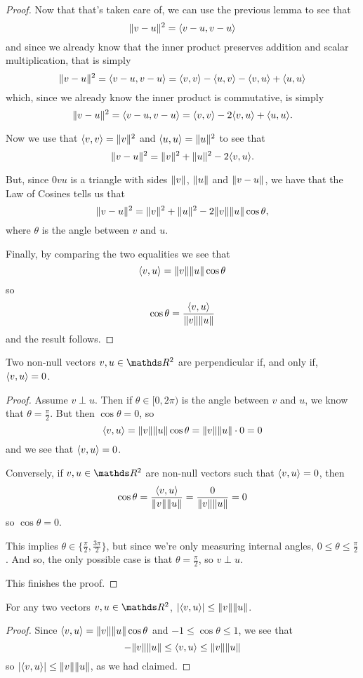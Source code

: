 \begin{proof}
	Now that that's taken care of, we can use the previous lemma to see that 
	\[\lVert v-u\rVert^2=\langle v-u,v-u\rangle\]and since we already know that the inner product preserves addition and scalar multiplication, that is simply
	\[\lVert v-u\rVert^2=\langle v-u,v-u\rangle=\langle v,v\rangle-\langle u,v\rangle-\langle v,u\rangle+\langle u,u\rangle\]which, since we already know the inner product is commutative, is simply
	\[\lVert v-u\rVert^2=\langle v-u,v-u\rangle=\langle v,v\rangle-2\langle v,u\rangle+\langle u,u\rangle.\]
	
	Now we use that $\langle v,v\rangle=\lVert v\rVert^2$ and $\langle u,u\rangle=\lVert u\rVert^2$ to see that
	\[\lVert v-u\rVert^2=\lVert v\rVert^2+\lVert u\rVert^2-2\langle v,u\rangle.\]
	
	But, since $0vu$ is a triangle with sides $\lVert v\rVert$, $\lVert u\rVert$ and $\lVert v-u\rVert$, we have that the Law of Cosines tells us that
	\[\lVert v-u\rVert^2=\lVert v\rVert^2+\lVert u\rVert^2-2\lVert v\rVert\lVert u\rVert\cos\theta,\]where $\theta$ is the angle between $v$ and $u$.
	
	Finally, by comparing the two equalities we see that\[\langle v,u\rangle=\lVert v\rVert\lVert u\rVert\cos\theta\]so
	\[\cos\theta=\frac{\langle v,u\rangle}{\lVert v\rVert\lVert u\rVert}\]and the result follows.
\end{proof}
\begin{cor}
	Two non-null vectors $v,u\in\R^2$ are perpendicular if, and only if, $\langle v,u\rangle=0$.
\end{cor}
\begin{proof}
	Assume $v\perp u$. Then if $\theta\in[0,2\pi)$ is the angle between $v$ and $u$, we know that $\theta=\frac{\pi}{2}$. But then $\cos\theta=0$, so
	\[\langle v,u\rangle=\lVert v\rVert\lVert u\rVert\cos\theta=\lVert v\rVert\lVert u\rVert\cdot0=0\]and we see that $\langle v,u\rangle=0$.
	
	Conversely, if $v,u\in \R^2$ are non-null vectors such that $\langle v,u\rangle=0$, then
	\[\cos\theta=\frac{\langle v,u\rangle}{\lVert v\rVert\lVert u\rVert}=\frac{0}{\lVert v\rVert\lVert u\rVert}=0\]so $\cos\theta=0$.
	
	This implies $\theta\in\{\frac{\pi}{2},\frac{3\pi}{2}\}$, but since we're only measuring internal angles, $0\leq \theta\leq\frac{\pi}{2}$. And so, the only possible case is that $\theta=\frac{\pi}{2}$, so $v\perp u$.
	
	This finishes the proof.
\end{proof}

\begin{cor}
	For any two vectors $v,u\in \R^2$, $\left\vert\langle v,u\rangle\right\vert\leq \lVert v\rVert\lVert u\rVert$.
\end{cor}
\begin{proof}
	Since $\langle v,u\rangle=\lVert v\rVert\lVert u\rVert\cos\theta$ and $-1\leq \cos\theta\leq 1$, we see that 
	\[-\lVert v\rVert\lVert u\rVert\leq \langle v,u\rangle\leq \lVert v\rVert\lVert u\rVert\]so $\left\vert\langle v,u\rangle\right\vert\leq \lVert v\rVert\lVert u\rVert$, as we had claimed.
\end{proof}


